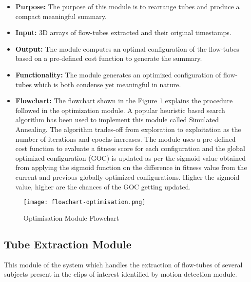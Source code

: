     \begin{itemize}
        \item \textbf{Purpose:} The purpose of this module is to rearrange tubes
        and produce a compact meaningful summary.
        \item \textbf{Input:} 3D arrays of flow-tubes extracted and their
        original timestamps.
        \item \textbf{Output:} The module computes an optimal configuration of
        the flow-tubes based on a pre-defined cost function to generate the
        summary.
        \item \textbf{Functionality:} The module generates an optimized
        configuration of flow-tubes which is both condense yet meaningful in
        nature.
        \item \textbf{Flowchart:} The flowchart shown in the Figure
        \ref{img:flowchart-optimisation} explains the procedure followed in the
        optimization module. A popular heuristic based search
        algorithm has been used to implement this module called Simulated
        Annealing. The algorithm trades-off from exploration to exploitation as
        the number of iterations and epochs increases. The module uses a
        pre-defined cost function to evaluate a fitness score for each
        configuration and the global optimized configuration (GOC) is updated as
        per the sigmoid value obtained from applying the sigmoid function on the
        difference in fitness value from the current and previous globally
        optimized configurations. Higher the sigmoid value, higher are the
        chances of the GOC getting updated.
    \end{itemize}


    \begin{figure}[H]
        \centering
        \texttt{[image: flowchart-optimisation.png]}
        \caption{Optimisation Module Flowchart}
        \label{img:flowchart-optimisation}
    \end{figure}


    \subsection{Tube Extraction Module}
    This module of the system which handles the extraction of flow-tubes of
    several subjects present in the clips of interest identified by motion
    detection module.

